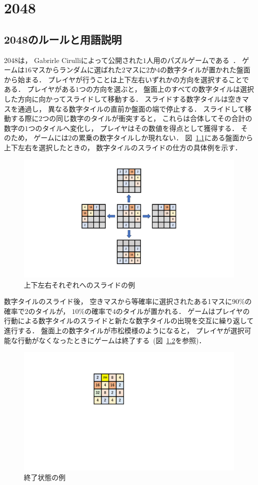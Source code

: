 \chapter{2048}

\section{2048のルールと用語説明}
\label{sec:rule}
2048は， Gabrirle Cirulliによって公開された$1$人用のパズルゲームである~\cite{2048}．
ゲームは$16$マスからランダムに選ばれた$2$マスに$2$か$4$の数字タイルが置かれた盤面から始まる．
プレイヤが行うことは上下左右いずれかの方向を選択することである． 
プレイヤがある$1$つの方向を選ぶと， 盤面上のすべての数字タイルは選択した方向に向かってスライドして移動する．
スライドする数字タイルは空きマスを通過し， 異なる数字タイルの直前か盤面の端で停止する．
スライドして移動する際に$2$つの同じ数字のタイルが衝突すると， これらは合体してその合計の数字の$1$つのタイルへ変化し， プレイヤはその数値を得点として獲得する．
そのため， ゲームには$2$の累乗の数字タイルしか現れない．
図~\ref{fig:all_directions}にある盤面から上下左右を選択したときの， 数字タイルのスライドの仕方の具体例を示す．
\begin{figure}[t]
    \centering
    \includegraphics[width=0.8\linewidth{}]{figures/all_directions.pdf}
    \caption{上下左右それぞれへのスライドの例 \label{fig:all_directions}}
\end{figure}

数字タイルのスライド後， 空きマスから等確率に選択されたある1マスに$90\%$の確率で$2$のタイルが， $10\%$の確率で$4$のタイルが置かれる． 
ゲームはプレイヤの行動による数字タイルのスライドと新たな数字タイルの出現を交互に繰り返して進行する．
盤面上の数字タイルが市松模様のようになると， プレイヤが選択可能な行動がなくなったときにゲームは終了する~(図~\ref{fig:terminal}を参照)．
\begin{figure}[t]
    \centering
    \includegraphics[width=0.2\linewidth{}]{figures/terminal_.pdf}
    \caption{終了状態の例 \label{fig:terminal}}
\end{figure}

